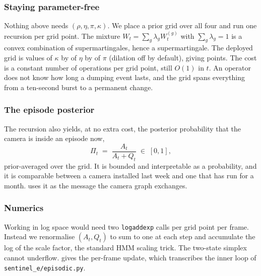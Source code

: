 \subsubsection{Staying parameter-free}
\label{sec:parameterfree}

Nothing above needs $(\rho, \eta, \pi, \kappa)$. We place a prior grid over all four and run one recursion per grid point. The mixture $W_t = \sum_g \lambda_g W_t^{(g)}$ with $\sum_g \lambda_g = 1$ is a convex combination of supermartingales, hence a supermartingale. The deployed grid is \EpiGridKappa{} values of $\kappa$ by \EpiGridEta{} of $\eta$ by \EpiGridPi{} of $\pi$ (dilation off by default), giving \EpiGridPoints{} points. The cost is a constant number of operations per grid point, still $O(1)$ in $t$. An operator does not know how long a dumping event lasts, and the grid spans everything from a ten-second burst to a permanent change.

\subsubsection{The episode posterior}

The recursion also yields, at no extra cost, the posterior probability that the camera is inside an episode now,
\begin{equation}
\label{eq:posterior}
  \Pi_t \;=\; \frac{A_t}{A_t + Q_t} \;\in\; [0, 1],
\end{equation}
prior-averaged over the grid. It is bounded and interpretable as a probability, and it is comparable between a camera installed last week and one that has run for a month.  uses it as the message the camera graph exchanges.

\subsubsection{Numerics}

Working in log space would need two \texttt{logaddexp} calls per grid point per frame. Instead we renormalise $(A_t, Q_t)$ to sum to one at each step and accumulate the log of the scale factor, the standard HMM scaling trick. The two-state simplex cannot underflow.  gives the per-frame update, which transcribes the inner loop of \texttt{sentinel\_e/episodic.py}.

